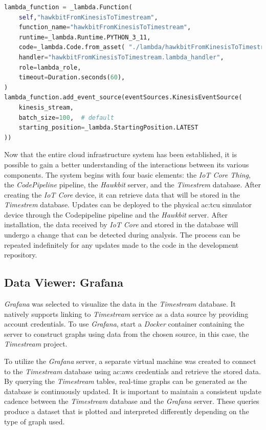 \begin{lstlisting}[language=Python, caption={CDK code for the creation of Lambda function that takes data from Kinesis stream and sends it to the Timestream tables}, label=lst:AWSTimestreamlambda]
lambda_function = _lambda.Function(
    self,"hawkbitFromKinesisToTimestream",
    function_name="hawkbitFromKinesisToTimestream",
    runtime=_lambda.Runtime.PYTHON_3_11,
    code=_lambda.Code.from_asset( "./lambda/hawkbitFromKinesisToTimestream.zip"),
    handler="hawkbitFromKinesisToTimestream.lambda_handler",
    role=lambda_role,
    timeout=Duration.seconds(60),
)
lambda_function.add_event_source(eventSources.KinesisEventSource(
    kinesis_stream,
    batch_size=100,  # default
    starting_position=_lambda.StartingPosition.LATEST
))
\end{lstlisting}
Now that the entire cloud infrastructure system has been established, it is possible to gain a better understanding of the interactions between its various components. The system begins with four basic elements: the \textit{IoT Core Thing}, the \textit{CodePipeline} pipeline, the \textit{Hawkbit} server, and the \textit{Timestrem} database. After creating the \textit{IoT Core} device, it can retrieve data that will be stored in the \textit{Timestrem} database. Updates can be deployed to the physical \gls{ac:tcu} simulator device through the Codepipeline pipeline and the \textit{Hawkbit} server. After installation, the data received by \textit{IoT Core} and stored in the database will undergo a change that can be detected during analysis. The process can be repeated indefinitely for any updates made to the code in the development repository.

\subsection{Data Viewer: Grafana}
\textit{Grafana} was selected to visualize the data in the \textit{Timestream} database. It natively supports linking to \textit{Timestream} service as a data source by providing account credentials. To use \textit{Grafana}, start a \textit{Docker} container containing the server to construct graphs using data from the chosen source, in this case, the \textit{Timestream} project.

To utilize the \textit{Grafana} server, a separate virtual machine was created to connect to the \textit{Timestream} database using \gls{ac:aws} credentials and retrieve the stored data. By querying the \textit{Timestream} tables, real-time graphs can be generated as the database is continuously updated. It is important to maintain a consistent update cadence between the \textit{Timestream} database and the \textit{Grafana} server. These queries produce a dataset that is plotted and interpreted differently depending on the type of graph used.

